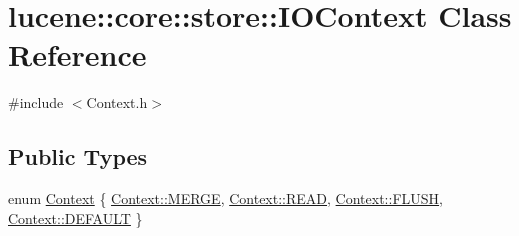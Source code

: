 \hypertarget{classlucene_1_1core_1_1store_1_1IOContext}{}\section{lucene\+:\+:core\+:\+:store\+:\+:I\+O\+Context Class Reference}
\label{classlucene_1_1core_1_1store_1_1IOContext}


{\ttfamily \#include $<$Context.\+h$>$}

\subsection*{Public Types}
\begin{DoxyCompactItemize}
\item 
enum \mbox{\hyperlink{classlucene_1_1core_1_1store_1_1IOContext_abe5d85deaa062a50cf92336fd3aeea96}{Context}} \{ \mbox{\hyperlink{classlucene_1_1core_1_1store_1_1IOContext_abe5d85deaa062a50cf92336fd3aeea96a97c51054c5ed46d2f88641ac57ff6347}{Context\+::\+M\+E\+R\+GE}}, 
\mbox{\hyperlink{classlucene_1_1core_1_1store_1_1IOContext_abe5d85deaa062a50cf92336fd3aeea96a3466fab4975481651940ed328aa990e4}{Context\+::\+R\+E\+AD}}, 
\mbox{\hyperlink{classlucene_1_1core_1_1store_1_1IOContext_abe5d85deaa062a50cf92336fd3aeea96a26eed7f078fc015c5252f817059a6f9f}{Context\+::\+F\+L\+U\+SH}}, 
\mbox{\hyperlink{classlucene_1_1core_1_1store_1_1IOContext_abe5d85deaa062a50cf92336fd3aeea96a5b39c8b553c821e7cddc6da64b5bd2ee}{Context\+::\+D\+E\+F\+A\+U\+LT}}
 \}
\end{DoxyCompactItemize}
